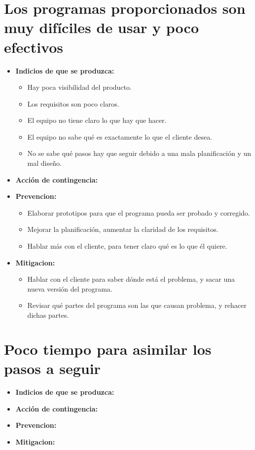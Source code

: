 \documentclass[spanish,a4paper,12pt]{report}	%
\begin{document}
	\section*{Los programas proporcionados son muy difíciles de usar y poco efectivos}
		\begin{itemize}
			\item \textbf {Indicios de que se produzca: }
				\begin{itemize}
				  \item Hay poca visibilidad del producto.
				  \item Los requisitos son poco claros. 
				  \item El equipo no tiene claro lo que hay que hacer.
				  \item El equipo no sabe qué es exactamente lo que el cliente desea. 
				  \item No se sabe qué pasos hay que seguir debido a una mala planificación y un mal diseño.
				\end{itemize} 
			\item \textbf {Acción de contingencia: }
			\item \textbf {Prevencion: }
				\begin{itemize}
				  \item Elaborar prototipos para que el programa pueda ser probado y corregido.
				  \item Mejorar la planificación, aumentar la claridad de los requisitos.
				  \item Hablar más con el cliente, para tener claro qué es lo que él quiere.
				\end{itemize}
			\item \textbf {Mitigacion: }
				\begin{itemize}
				  \item Hablar con el cliente para saber dónde está el problema, y sacar una nueva versión del programa.
				  \item Revisar qué partes del programa son las que causan problema, y rehacer dichas partes.
				\end{itemize}
		\end{itemize}
		
	\section*{Poco tiempo para asimilar los pasos a seguir}
		\begin{itemize}
			\item \textbf {Indicios de que se produzca: }
			\item \textbf {Acción de contingencia: }
			\item \textbf {Prevencion: }
			\item \textbf {Mitigacion: }
		\end{itemize}
	
\end{document}

